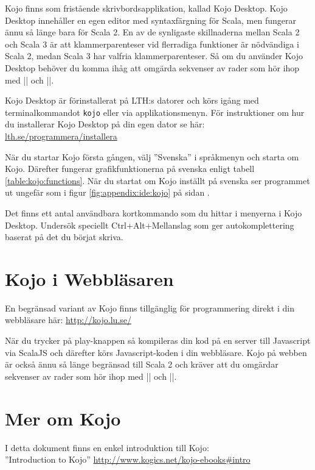 Kojo finns som fristående skrivbordsapplikation, kallad Kojo Desktop. Kojo Desktop innehåller en egen editor med syntaxfärgning för Scala, men fungerar ännu så länge bara för Scala 2. En av de synligaste skillnaderna mellan Scala 2 och Scala 3 är att klammerparenteser vid flerradiga funktioner är nödvändiga i Scala 2, medan Scala 3 har valfria klammerparenteser. Så om du använder Kojo Desktop behöver du komma ihåg att omgärda sekvenser av rader som hör ihop med \code|{| och \code|}|. 

Kojo Desktop är förinstallerat på LTH:s datorer och körs igång med terminalkommandot \texttt{kojo} eller via applikationsmenyn.  För instruktioner om hur du installerar Kojo Desktop på din egen dator se här: \href{http://www.lth.se/programmera/installera/}{lth.se/programmera/installera}

När du startar Kojo första gången, välj ''Svenska'' i språkmenyn och starta om Kojo. Därefter fungerar grafikfunktionerna på svenska enligt tabell \ref{table:kojo:functions}. När du startat om Kojo inställt på svenska ser programmet ut ungefär som i figur \ref{fig:appendix:ide:kojo} på sidan \pageref{fig:appendix:ide:kojo}.

Det finns ett antal användbara kortkommando som du hittar i menyerna i Kojo Desktop. Undersök speciellt Ctrl+Alt+Mellanslag som ger autokomplettering baserat på det du börjat skriva.

\section{Kojo i Webbläsaren}

En begränsad variant av Kojo finns tillgänglig för programmering direkt i din webbläsare här: \url{http://kojo.lu.se/}

När du trycker på play-knappen så kompileras din kod på en server till Javascript via ScalaJS och därefter körs Javascript-koden i din webbläsare. 
Kojo på webben är också ännu så länge begränsad till Scala 2 och kräver att du omgärdar sekvenser av rader som hör ihop med \code|{| och \code|}|.


\section{Mer om Kojo}

I detta dokument finns en enkel introduktion till Kojo: \\ ''Introduction to Kojo'' \url{http://www.kogics.net/kojo-ebooks#intro}
